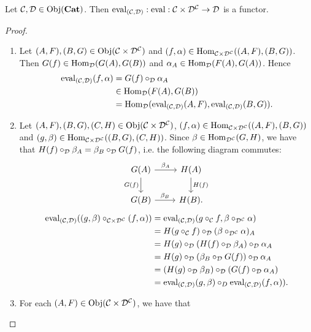 \documentclass{book}
\begin{document}
	\begin{ex} 
		Let $\mathcal{C}, \mathcal{D} \in \operatorname{Obj}(\operatorname*{\text{\textbf{Cat}}})$. Then $\text{eval}_{(\mathcal{C}, \mathcal{D})}: \text{eval}:\mathcal{C} \times \mathcal{D}^{\mathcal{C}} \rightarrow \mathcal{D}$ is a functor. 
	\end{ex}
	
	\begin{proof}\
		\begin{enumerate}
			\item Let $(A, F), (B,G) \in \operatorname{Obj}(\mathcal{C} \times \mathcal{D}^{\mathcal{C}})$ and $(f, \alpha) \in \operatorname{Hom}_{\mathcal{C} \times \mathcal{D}^{\mathcal{C}}}((A, F), (B,G))$. Then $G(f) \in \operatorname{Hom}_{\mathcal{D}}(G(A), G(B))$ and $\alpha_A \in \operatorname{Hom}_{\mathcal{D}}(F(A), G(A))$. Hence
			\begin{align*}
				\text{eval}_{(\mathcal{C}, \mathcal{D})}(f, \alpha)
				& = G(f) \circ_{\mathcal{D}} \alpha_A \\
				& \in \operatorname{Hom}_{\mathcal{D}}(F(A), G(B)) \\
				& = \operatorname{Hom}_{\mathcal{D}}(\text{eval}_{(\mathcal{C}, \mathcal{D})}(A, F), \text{eval}_{(\mathcal{C}, \mathcal{D})}(B, G)). 
			\end{align*}
			\item Let $(A, F), (B,G), (C, H) \in \operatorname{Obj}(\mathcal{C} \times \mathcal{D}^{\mathcal{C}})$, $(f, \alpha) \in \operatorname{Hom}_{\mathcal{C} \times \mathcal{D}^{\mathcal{C}}}((A, F), (B,G))$ and $(g, \beta) \in \operatorname{Hom}_{\mathcal{C} \times \mathcal{D}^{\mathcal{C}}}((B, G), (C,H))$. 
			Since $\beta \in \operatorname{Hom}_{\mathcal{D}^{\mathcal{C}}}(G,H)$, we have that $H(f) \circ_{\mathcal{D}} \beta_A = \beta_B \circ_{\mathcal{D}} G(f)$, i.e. the following diagram commutes:
			\[
			\begin{tikzcd}
				G(A)  \arrow[r, "\be_A"] \arrow[d, "{G(f)}"'] & H(A) \arrow[d, "{H(f)}"] \\
				G(B)  \arrow[r, "\be_B"] & H(B).
			\end{tikzcd}
			\]
			\begin{align*}
				\text{eval}_{(\mathcal{C}, \mathcal{D})}((g, \beta) \circ_{\mathcal{C} \times \mathcal{D}^{\mathcal{C}}} (f, \alpha))
				& = \text{eval}_{(\mathcal{C}, \mathcal{D})}(g \circ_{\mathcal{C}} f, \beta \circ_{\mathcal{D}^{\mathcal{C}}} \alpha) \\
				& = H(g \circ_{\mathcal{C}} f) \circ_{\mathcal{D}} (\beta \circ_{\mathcal{D}^{\mathcal{C}}} \alpha)_A \\
				& = H(g) \circ_{\mathcal{D}} (H(f) \circ_{\mathcal{D}} \beta_A) \circ_{\mathcal{D}} \alpha_A \\
				& = H(g) \circ_{\mathcal{D}} (\beta_B \circ_{\mathcal{D}} G(f)) \circ_{\mathcal{D}} \alpha_A \\
				& = (H(g) \circ_{\mathcal{D}} \beta_B) \circ_{\mathcal{D}} (G(f) \circ_{\mathcal{D}} \alpha_A) \\
				& = \text{eval}_{(\mathcal{C}, \mathcal{D})}(g, \beta) \circ_{D} \text{eval}_{(\mathcal{C}, \mathcal{D})}(f, \alpha)).
			\end{align*}
			\item For each $(A, F) \in \operatorname{Obj}(\mathcal{C} \times \mathcal{D}^{\mathcal{C}})$, we have that 

\end{enumerate}
\end{proof}
\end{document}
